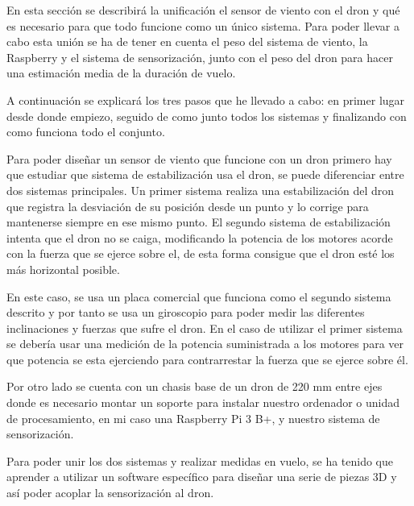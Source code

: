 
En esta sección se describirá la unificación el sensor de viento con el dron y qué es necesario para que todo funcione como un único sistema.
Para poder llevar a cabo esta unión se ha de tener en cuenta el peso del sistema de viento, la Raspberry y el sistema de sensorización, junto con el peso del dron para hacer una estimación media de la duración de vuelo.

A continuación se explicará los tres pasos que he llevado a cabo: en primer lugar desde donde empiezo, seguido de como junto todos los sistemas y finalizando con como funciona todo el conjunto.

Para poder diseñar un sensor de viento que funcione con un dron primero hay que estudiar que sistema de estabilización usa el dron, se puede diferenciar entre dos sistemas principales. Un primer sistema realiza una estabilización del dron que registra la desviación de su posición desde un punto y lo corrige para mantenerse siempre en ese mismo punto. El segundo sistema de estabilización intenta que el dron no se caiga, modificando la potencia de los motores acorde con la fuerza que se ejerce sobre el, de esta forma consigue que el dron esté los más horizontal posible.

En este caso, se usa un placa comercial que funciona como el segundo sistema descrito y por tanto se usa un giroscopio para poder medir las diferentes inclinaciones y fuerzas que sufre el dron. En el caso de utilizar el primer sistema se debería usar una medición de la potencia suministrada a los motores para ver que potencia se esta ejerciendo para contrarrestar la fuerza que se ejerce sobre él.

Por otro lado se cuenta con un chasis base de un dron de 220 mm entre ejes donde es necesario montar un soporte para instalar nuestro ordenador o unidad de procesamiento, en mi caso una Raspberry Pi 3 B+, y nuestro sistema de sensorización.

Para poder unir los dos sistemas y realizar medidas en vuelo, se ha tenido que aprender a utilizar un software específico para diseñar una serie de piezas 3D y así poder acoplar la sensorización al dron.

